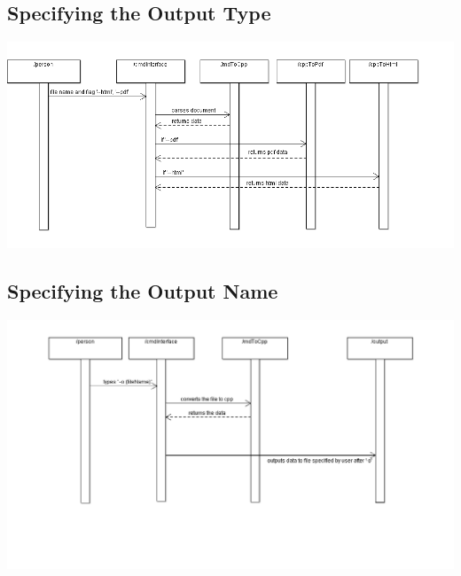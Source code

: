 \subsection{Specifying the Output Type}
\hspace{-3cm}\includegraphics[width=550pt]{images/SpecifyingOutputFile.png}

\subsection{Specifying the Output Name}
\hspace{-3cm}\includegraphics[width=500pt]{images/SpecifyingOutputName.png}
